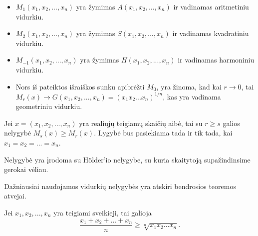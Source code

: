 \begin{itemize}
  \item $M_{1}(x_{1},x_{2},...,x_{n})$ yra žymimas $A(x_{1},x_{2},...,x_{n})$ ir vadinamas aritmetiniu vidurkiu.
  \item $M_{2}(x_{1},x_{2},...,x_{n})$ yra žymimas $S(x_{1},x_{2},...,x_{n})$ ir vadinamas kvadratiniu vidurkiu.
  \item $M_{-1}(x_{1},x_{2},...,x_{n})$ yra žymimas $H(x_{1},x_{2},...,x_{n})$ ir vadinamas harmoniniu vidurkiu.
  \item Nors iš pateiktos išraiškos sunku apibrėžti $M_{0}$, yra žinoma,
    kad kai $r\rightarrow0$, tai $M_{r}(x)\rightarrow
    G(x_{1},x_{2},...,x_{n})=(x_{1}x_{2}...x_{n})^{1/n}$, kas yra vadinama
    geometriniu vidurkiu.
\end{itemize}

\begin{thm}
  Jei $x=(x_{1},x_{2},...,x_{n})$ yra realiųjų teigiamų skaičių aibė, tai su
  $r\geq s$ galios nelygybė $M_{s}(x)\geq M_{r}(x)$. Lygybė bus pasiekiama
  tada ir tik tada, kai $x_{1}=x_{2}=...=x_{n}$.
\end{thm}

Nelygybė yra įrodoma su H\"{o}lder'io nelygybe, su kuria skaitytoją
supažindinsime gerokai vėliau.

Dažniausiai naudojamos vidurkių nelygybės yra atskiri bendrosios teoremos
atvejai.

\begin{thm}[AM-GM nelygybė]
  Jei $x_{1},x_{2},...,x_{n}$ yra teigiami sveikieji, tai galioja
  $$\frac{x_{1}+x_{2}+...+x_{n}}{n}\geq \sqrt[n]{x_{1}x_{2}...x_{n}}.$$
\end{thm}

